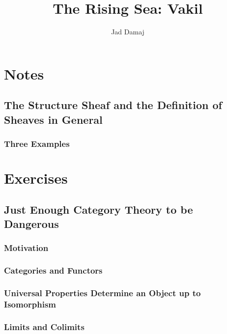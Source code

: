 \documentclass[openany]{book}
\title{The Rising Sea: Vakil}
\author{Jad Damaj}
\date{}
\begin{document}
\maketitle

\tableofcontents

\newpage

\part{Notes}

\chapter{The Structure Sheaf and the Definition of Sheaves in General}

\section{Three Examples}




\part{Exercises}


\chapter{Just Enough Category Theory to be Dangerous}

\section{Motivation}

\section{Categories and Functors}



\section{Universal Properties Determine an Object up to Isomorphism}



\section{Limits and Colimits}
\end{document}
